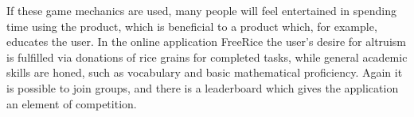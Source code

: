 If these game mechanics are used, many people will feel entertained in spending time using the product, which is beneficial to a product which, for example, educates the user. In the online application FreeRice the user's desire for altruism is fulfilled via donations of rice grains for completed tasks, while general academic skills are honed, such as vocabulary and basic mathematical proficiency. Again it is possible to join groups, and there is a leaderboard which gives the application an element of competition. \cite{freerice}

